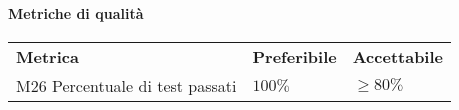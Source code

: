     	\paragraph{Metriche di qualità}
    	\begin{longtable} {
    			>{}p{80mm} 
    			>{}p{25mm}
    			>{}p{25mm}
    		}
    		\rowcolor{gray!50}
    		\textbf{Metrica} & \textbf{Preferibile} & \textbf{Accettabile} \TBstrut \TBstrut \\
    		M26 Percentuale di test passati & $100\%$ & $\ge 80\%$ \TBstrut \\ [2mm]
    	\end{longtable}
